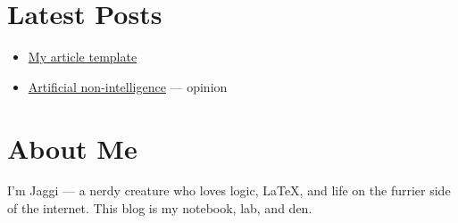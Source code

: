 \documentclass{article}
\begin{document}
\section*{Latest Posts}

\begin{itemize}
  \item \href{posts/article-template.html}{My article template}
  \item
    \href{posts/artificial-non-intelligence/artificial-non-intelligence.html}{Artificial
    non-intelligence} --- opinion
\end{itemize}

\section*{About Me}

I'm Jaggi — a nerdy creature who loves logic, LaTeX, and life on the
furrier side of the internet. This blog is my notebook, lab, and den.
\end{document}
